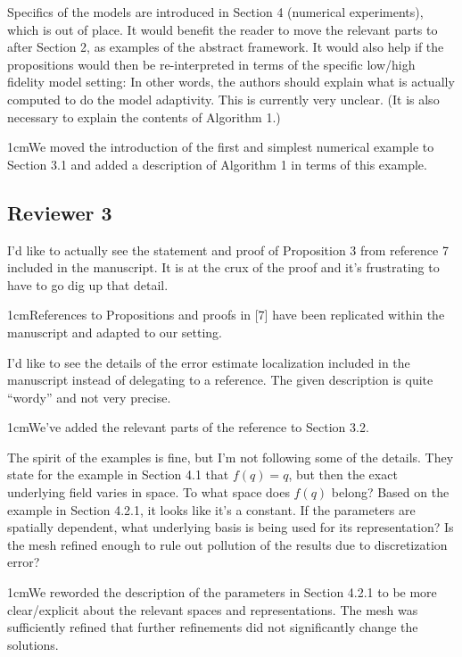 \documentclass[12pt, letterpaper]{article}
\newcommand{\answer}[1]{\begin{adjustwidth}{1cm}{}{\color{blue}#1}\end{adjustwidth}}
\begin{document}
Specifics of the models are introduced in Section 4 (numerical experiments), which is out of place. It would benefit the reader to move the relevant parts to after Section 2, as examples of the abstract framework. It would also help if the propositions would then be re-interpreted in terms of the specific low/high fidelity model setting: In other words, the authors should explain what is actually computed to do the model adaptivity. This is currently very unclear. (It is also necessary to explain the contents of Algorithm 1.)

\answer{We moved the introduction of the first and simplest numerical example to Section 3.1 and added a description of Algorithm 1 in terms of this example.}


\subsection*{Reviewer 3}

I'd like to actually see the statement and proof of Proposition 3 from reference 7 included in
the manuscript. It is at the crux of the proof and it's frustrating to have to go dig up that
detail.

\answer{References to Propositions and proofs in [7] have been replicated within the manuscript and adapted to our setting.}

I'd like to see the details of the error estimate localization included in the manuscript instead
of delegating to a reference. The given description is quite “wordy” and not very precise.

\answer{We've added the relevant parts of the reference to Section 3.2.}

The spirit of the examples is fine, but I'm not following some of the details. They state for
the example in Section 4.1 that $f (q) = q$, but then the exact underlying field varies in space.
To what space does $f (q)$ belong? Based on the example in Section 4.2.1, it looks like it's
a constant. If the parameters are spatially dependent, what underlying basis is being used
for its representation? Is the mesh refined enough to rule out pollution of the results due to
discretization error?

\answer{We reworded the description of the parameters in Section 4.2.1 to be more clear/explicit about the relevant spaces and representations. The mesh was sufficiently refined that further refinements did not significantly change the solutions.}
\end{document}
